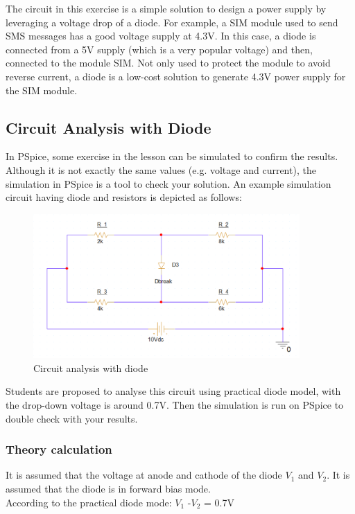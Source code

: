 The circuit in this exercise is a simple solution to design a power supply by leveraging a voltage drop of a diode. For example, a SIM module used to send SMS messages has a good voltage supply at 4.3V. In this case, a diode is connected from a 5V supply (which is a very popular voltage) and then, connected to the module SIM. Not only used to protect the module to avoid reverse current, a diode is a low-cost solution to generate 4.3V power supply for the SIM module.

\subsection{Circuit Analysis with Diode}
In PSpice, some exercise in the lesson can be simulated to confirm the results. Although it is not exactly the same values (e.g. voltage and current), the simulation in PSpice is a tool to check your solution. An example simulation circuit having diode and resistors is depicted as follows:

\begin{figure}[!htp]
    \label{pic:halfwave_rectifier}
    \centering
    \includegraphics[width = 4in]{source/picture/bai_2/diode_10.PNG}
    \caption{Circuit analysis with diode}
    \label{lab02_ex031b}
\end{figure}

Students are proposed to analyse this circuit using practical diode model, with the drop-down voltage is around 0.7V. Then the simulation is run on PSpice to double check with your results.
\subsubsection{Theory calculation}
It is assumed that the voltage at anode and cathode of the diode $V_1$ and $V_2$. It is assumed that the diode is in forward bias mode.\\

According to the practical diode mode: $V_1$ -$V_2$ = 0.7V\\

